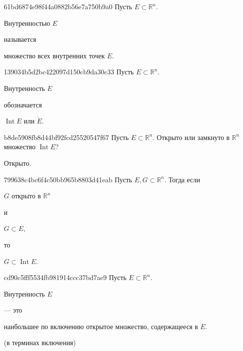 \begin{note}{61bd6874e98f44a0882b56e7a750b9a0}
    Пусть \({ E \subset \mathbb R^{n} }\).
    \begin{icloze}{2}Внутренностью \({ E }\)\end{icloze} называется \begin{icloze}{1}множество всех внутренних точек \({ E }\).\end{icloze}
\end{note}

\begin{note}{139034b5d2bc422097d150cb9da30c33}
    Пусть \({ E \subset \mathbb R^{n} }\).
    \begin{icloze}{2}Внутренность \({ E }\)\end{icloze} обозначается
    \begin{icloze}{1}
        \begin{center}
            \({ \operatorname{Int} E }\) или \({ \mathring{E} }\).
        \end{center}
    \end{icloze}
\end{note}

\begin{note}{b8de5908fb8d44bf92fcd25520547f67}
    Пусть \({ E \subset \mathbb R^{n} }\).
    Открыто или замкнуто в \({ \mathbb R^{n} }\) множество \({ \operatorname{Int} E }\)?

    \begin{cloze}{1}
        Открыто.
    \end{cloze}
\end{note}

\begin{note}{799638c4bc6f4c50bb965b8803d41eab}
    Пусть \({ E, G \subset \mathbb R^{n} }\).
    Тогда если \begin{icloze}{3}\({ G }\) открыто в \({ \mathbb R^{n} }\)\end{icloze} и \begin{icloze}{2}\({ G \subset E }\),\end{icloze} то \begin{icloze}{1}\({ G \subset \operatorname{Int} E }\).\end{icloze}
\end{note}

\begin{note}{cd90c5fff5534fb981914ccc37bd7ae9}
    Пусть \({ E \subset \mathbb R^{n} }\).
    \begin{icloze}{2}Внутренность \({ E }\)\end{icloze} --- это \begin{icloze}{1}наибольшее по включению открытое множество, содержащееся в \({ E }\).\end{icloze}

    \begin{center}
        \tiny (в терминах включения)
    \end{center}
\end{note}

